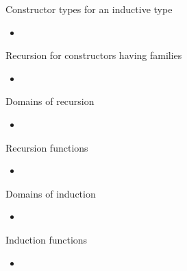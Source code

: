 \documentclass[10 pt., handout]{beamer}
\theoremstyle{plain}
\theoremstyle{remark}
\begin{document}
\begin{frame}{Constructor types for an inductive type}

\begin{itemize}

  \item


\end{itemize}

\end{frame}



\begin{frame}{Recursion for constructors having families}

\begin{itemize}

  \item


\end{itemize}

\end{frame}



\begin{frame}{Domains of recursion}

\begin{itemize}

  \item


\end{itemize}

\end{frame}


\begin{frame}{Recursion functions}

\begin{itemize}

  \item


\end{itemize}

\end{frame}


\begin{frame}{Domains of induction}

\begin{itemize}

  \item


\end{itemize}

\end{frame}


\begin{frame}{Induction functions}

\begin{itemize}

  \item


\end{itemize}

\end{frame}
\end{document}
